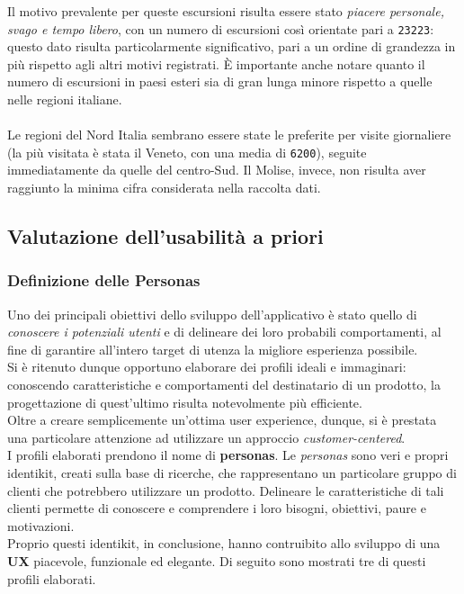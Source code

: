 \documentclass{natourDoc}
\begin{document}
Il motivo prevalente per queste escursioni risulta essere stato \textit{piacere personale, svago e tempo libero}, con un numero
di escursioni così orientate pari a \texttt{23223}: questo dato risulta particolarmente significativo, pari a un ordine
di grandezza in più rispetto agli altri motivi registrati. È importante anche notare quanto il numero di escursioni in paesi
esteri sia di gran lunga minore rispetto a quelle nelle regioni italiane.\\\\
Le regioni del Nord Italia sembrano essere state le preferite per visite giornaliere (la più visitata è stata il Veneto, con una media di
\texttt{6200}), seguite immediatamente da quelle del centro-Sud. Il Molise, invece, non risulta aver raggiunto
la minima cifra considerata nella raccolta dati.\\

\subsection{Valutazione dell'usabilità a priori}

\subsubsection{Definizione delle Personas}
Uno dei principali obiettivi dello sviluppo dell'applicativo è stato quello di \textit{conoscere i potenziali utenti} 
e di delineare dei loro probabili comportamenti, al fine di garantire all'intero target di utenza la migliore esperienza 
possibile. \\
Si è ritenuto dunque opportuno elaborare dei profili ideali e immaginari: conoscendo caratteristiche e comportamenti del destinatario 
di un prodotto, la progettazione di quest'ultimo risulta notevolmente più efficiente. \\
Oltre a creare semplicemente un'ottima user experience, dunque, si è prestata una particolare attenzione ad utilizzare un approccio \textit{customer-centered}. \\
I profili elaborati prendono il nome di \textbf{personas}. Le \textit{personas} sono veri e propri identikit, creati sulla base di ricerche, che rappresentano un particolare
gruppo di clienti che potrebbero utilizzare un prodotto. Delineare le caratteristiche di tali clienti permette di conoscere e comprendere i 
loro bisogni, obiettivi, paure e motivazioni.\\
Proprio questi identikit, in conclusione, hanno contruibito allo sviluppo di una \textbf{UX} piacevole, funzionale ed elegante. Di seguito sono mostrati tre di questi profili elaborati. \\
\end{document}
